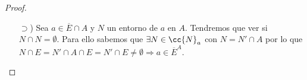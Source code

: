 \begin{prop}
\begin{proof}
\begin{enumerate}
\begin{itemize}
                \item[$\supset$)] Sea $a \in \overline{E}\cap A$ y $N$ un entorno de $a$ en $A$. Tendremos que ver si $N\cap N = \emptyset$. Para ello sabemos que $\exists N \in \cc{N}_a$ con $N=N'\cap A$ por lo que $N\cap E = N'\cap A \cap E = N' \cap E \neq \emptyset\Rightarrow a \in \overline{E}^A$.
            \end{itemize} 
        \end{enumerate}
    \end{proof}
\end{prop}